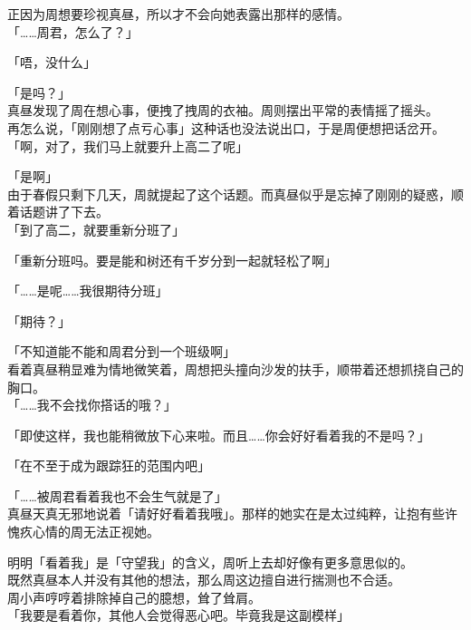 正因为周想要珍视真昼，所以才不会向她表露出那样的感情。\\

「……周君，怎么了？」

「唔，没什么」

「是吗？」\\

真昼发现了周在想心事，便拽了拽周的衣袖。周则摆出平常的表情摇了摇头。\\

再怎么说，「刚刚想了点亏心事」这种话也没法说出口，于是周便想把话岔开。\\

「啊，对了，我们马上就要升上高二了呢」

「是啊」\\

由于春假只剩下几天，周就提起了这个话题。而真昼似乎是忘掉了刚刚的疑惑，顺着话题讲了下去。\\

「到了高二，就要重新分班了」

「重新分班吗。要是能和树还有千岁分到一起就轻松了啊」

「……是呢……我很期待分班」

「期待？」

「不知道能不能和周君分到一个班级啊」\\

看着真昼稍显难为情地微笑着，周想把头撞向沙发的扶手，顺带着还想抓挠自己的胸口。\\

「……我不会找你搭话的哦？」

「即使这样，我也能稍微放下心来啦。而且……你会好好看着我的不是吗？」

「在不至于成为跟踪狂的范围内吧」

「……被周君看着我也不会生气就是了」\\

真昼天真无邪地说着「请好好看着我哦」。那样的她实在是太过纯粹，让抱有些许愧疚心情的周无法正视她。

明明「看着我」是「守望我」的含义，周听上去却好像有更多意思似的。\\

既然真昼本人并没有其他的想法，那么周这边擅自进行揣测也不合适。\\

周小声哼哼着排除掉自己的臆想，耸了耸肩。\\

「我要是看着你，其他人会觉得恶心吧。毕竟我是这副模样」\\

